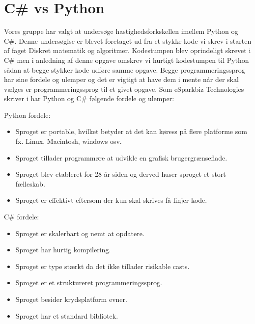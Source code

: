 \documentclass[class=report, crop=false]{standalone}
\begin{document}
    \section{C\# vs Python}
        Vores gruppe har valgt at undersøge hastighedsforkskellen imellem Python og C\#. Denne undersøglse er blevet foretaget ud fra et stykke kode vi skrev i starten af faget Diskret matematik og algoritmer.
        Kodestumpen blev oprindeligt skrevet i C\# men i anledning af denne opgave omskrev vi hurtigt kodestumpen til Python sådan at begge stykker kode udføre samme opgave. 
        Begge programmeringssprog har sine fordele og ulemper og det er vigtigt at have dem i mente når der skal vælges er programmeringssprog til et givet opgave.
        Som eSparkbiz Technologies skriver i \cite{esparkinfo} har Python og C\# følgende fordele og ulemper:
        \begin{multicols}{2}
        \raggedcolumns
        \begin{tcolorbox}
        \noindent\textcolor{ao(english)}{Python fordele:}
        \begin{itemize}
            \setlength{\itemsep}{0pt}
            \setlength{\parskip}{0pt}
            \item Sproget er portable, hvilket betyder at det kan køress på flere platforme som fx. Linux, Macintosh, windows osv.
            \item Sproget tillader programmøre at udvikle en grafisk brugergrænseflade.
            \item Sproget blev etableret for 28 år siden og derved huser sproget et stort fælleskab.
            \item Sproget er effektivt eftersom der kun skal skrives få linjer kode.
        \end{itemize}
        \end{tcolorbox}
        \columnbreak

        \begin{tcolorbox}
        \noindent\textcolor{ao(english)}{C\# fordele:}
        \begin{itemize}
            \setlength{\itemsep}{0pt}
            \setlength{\parskip}{0pt}
            \item Sproget er skalerbart og nemt at opdatere.
            \item Sproget har hurtig kompilering.
            \item Sproget er type stærkt da det ikke tillader risikable casts.
            \item Sproget er et struktureret programmeringssprog.
            \item Sproget besider krydsplatform evner.
            \item Sproget har et standard bibliotek.
        \end{itemize}
        \end{tcolorbox}
        \end{multicols}
\end{document}
